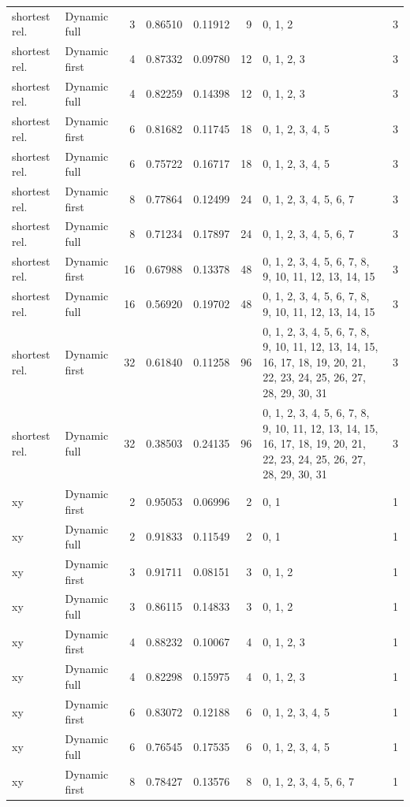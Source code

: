 \documentclass[10pt,a4paper]{article}
\begin{document}
\begin{longtable}{@{}p{23mm}p{29mm}rrrrp{36mm}r@{}}
shortest rel. & Dynamic full & 3 & 0.86510 & 0.11912 & 9 & 0, 1, 2 & 3 \\
shortest rel. & Dynamic first & 4 & 0.87332 & 0.09780 & 12 & 0, 1, 2, 3 & 3 \\
shortest rel. & Dynamic full & 4 & 0.82259 & 0.14398 & 12 & 0, 1, 2, 3 & 3 \\
shortest rel. & Dynamic first & 6 & 0.81682 & 0.11745 & 18 & 0, 1, 2, 3, 4, 5 & 3 \\
shortest rel. & Dynamic full & 6 & 0.75722 & 0.16717 & 18 & 0, 1, 2, 3, 4, 5 & 3 \\
shortest rel. & Dynamic first & 8 & 0.77864 & 0.12499 & 24 & 0, 1, 2, 3, 4, 5, 6, 7 & 3 \\
shortest rel. & Dynamic full & 8 & 0.71234 & 0.17897 & 24 & 0, 1, 2, 3, 4, 5, 6, 7 & 3 \\
shortest rel. & Dynamic first & 16 & 0.67988 & 0.13378 & 48 & 0, 1, 2, 3, 4, 5, 6, 7, 8, 9, 10, 11, 12, 13, 14, 15 & 3 \\
shortest rel. & Dynamic full & 16 & 0.56920 & 0.19702 & 48 & 0, 1, 2, 3, 4, 5, 6, 7, 8, 9, 10, 11, 12, 13, 14, 15 & 3 \\
shortest rel. & Dynamic first & 32 & 0.61840 & 0.11258 & 96 & 0, 1, 2, 3, 4, 5, 6, 7, 8, 9, 10, 11, 12, 13, 14, 15, 16, 17, 18, 19, 20, 21, 22, 23, 24, 25, 26, 27, 28, 29, 30, 31 & 3 \\
shortest rel. & Dynamic full & 32 & 0.38503 & 0.24135 & 96 & 0, 1, 2, 3, 4, 5, 6, 7, 8, 9, 10, 11, 12, 13, 14, 15, 16, 17, 18, 19, 20, 21, 22, 23, 24, 25, 26, 27, 28, 29, 30, 31 & 3 \\
xy & Dynamic first & 2 & 0.95053 & 0.06996 & 2 & 0, 1 & 1 \\
xy & Dynamic full & 2 & 0.91833 & 0.11549 & 2 & 0, 1 & 1 \\
xy & Dynamic first & 3 & 0.91711 & 0.08151 & 3 & 0, 1, 2 & 1 \\
xy & Dynamic full & 3 & 0.86115 & 0.14833 & 3 & 0, 1, 2 & 1 \\
xy & Dynamic first & 4 & 0.88232 & 0.10067 & 4 & 0, 1, 2, 3 & 1 \\
xy & Dynamic full & 4 & 0.82298 & 0.15975 & 4 & 0, 1, 2, 3 & 1 \\
xy & Dynamic first & 6 & 0.83072 & 0.12188 & 6 & 0, 1, 2, 3, 4, 5 & 1 \\
xy & Dynamic full & 6 & 0.76545 & 0.17535 & 6 & 0, 1, 2, 3, 4, 5 & 1 \\
xy & Dynamic first & 8 & 0.78427 & 0.13576 & 8 & 0, 1, 2, 3, 4, 5, 6, 7 & 1 \\

\end{longtable}
\end{document}
